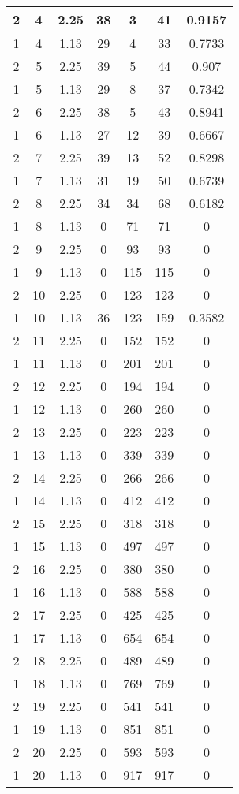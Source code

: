 \documentclass[letterpaper, 12pt]{article}
\begin{document}
\begin{longtable}{|c|c|c|c|c|c|c|}
\hline
2 & 4 & 2.25 & 38 & 3 & 41 & 0.9157 \\
\hline
1 & 4 & 1.13 & 29 & 4 & 33 & 0.7733 \\
\hline
2 & 5 & 2.25 & 39 & 5 & 44 & 0.907 \\
\hline
1 & 5 & 1.13 & 29 & 8 & 37 & 0.7342 \\
\hline
2 & 6 & 2.25 & 38 & 5 & 43 & 0.8941 \\
\hline
1 & 6 & 1.13 & 27 & 12 & 39 & 0.6667 \\
\hline
2 & 7 & 2.25 & 39 & 13 & 52 & 0.8298 \\
\hline
1 & 7 & 1.13 & 31 & 19 & 50 & 0.6739 \\
\hline
2 & 8 & 2.25 & 34 & 34 & 68 & 0.6182 \\
\hline
1 & 8 & 1.13 & 0 & 71 & 71 & 0 \\
\hline
2 & 9 & 2.25 & 0 & 93 & 93 & 0 \\
\hline
1 & 9 & 1.13 & 0 & 115 & 115 & 0 \\
\hline
2 & 10 & 2.25 & 0 & 123 & 123 & 0 \\
\hline
1 & 10 & 1.13 & 36 & 123 & 159 & 0.3582 \\
\hline
2 & 11 & 2.25 & 0 & 152 & 152 & 0 \\
\hline
1 & 11 & 1.13 & 0 & 201 & 201 & 0 \\
\hline
2 & 12 & 2.25 & 0 & 194 & 194 & 0 \\
\hline
1 & 12 & 1.13 & 0 & 260 & 260 & 0 \\
\hline
2 & 13 & 2.25 & 0 & 223 & 223 & 0 \\
\hline
1 & 13 & 1.13 & 0 & 339 & 339 & 0 \\
\hline
2 & 14 & 2.25 & 0 & 266 & 266 & 0 \\
\hline
1 & 14 & 1.13 & 0 & 412 & 412 & 0 \\
\hline
2 & 15 & 2.25 & 0 & 318 & 318 & 0 \\
\hline
1 & 15 & 1.13 & 0 & 497 & 497 & 0 \\
\hline
2 & 16 & 2.25 & 0 & 380 & 380 & 0 \\
\hline
1 & 16 & 1.13 & 0 & 588 & 588 & 0 \\
\hline
2 & 17 & 2.25 & 0 & 425 & 425 & 0 \\
\hline
1 & 17 & 1.13 & 0 & 654 & 654 & 0 \\
\hline
2 & 18 & 2.25 & 0 & 489 & 489 & 0 \\
\hline
1 & 18 & 1.13 & 0 & 769 & 769 & 0 \\
\hline
2 & 19 & 2.25 & 0 & 541 & 541 & 0 \\
\hline
1 & 19 & 1.13 & 0 & 851 & 851 & 0 \\
\hline
2 & 20 & 2.25 & 0 & 593 & 593 & 0 \\
\hline
1 & 20 & 1.13 & 0 & 917 & 917 & 0 \\
\hline
\end{longtable}
\end{document}
